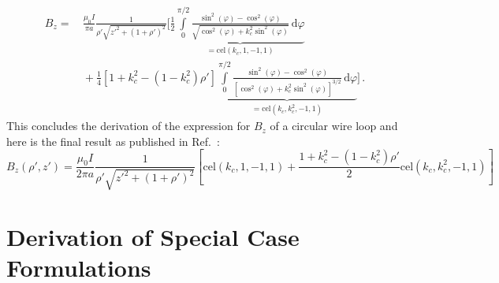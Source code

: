 \begin{align}
  B_z
 =&\, \frac{\mu_0 I}{\pi a}
      \frac{1}{\rho' \sqrt{z'^2 + (1 + \rho')^2}} \Biggl[
        \frac{1}{2} \underbrace{\int\limits_0^{\pi/2} \frac{\sin^2(\varphi) - \cos^2(\varphi)}
                                                           {\sqrt{\cos^2(\varphi) + k_c^2 \sin^2(\varphi)}} \,\mathrm{d}\varphi}_{=\textrm{cel}(k_c, 1, -1, 1)} \nonumber \\
 ~&\, + \frac{1}{4} \left[ 1 + k_c^2 - \left( 1 - k_c^2 \right) \rho' \right]
          \underbrace{\int\limits_0^{\pi/2} \frac{\sin^2(\varphi) - \cos^2(\varphi)}
                                                 {\left[\cos^2(\varphi) + k_c^2 \sin^2(\varphi) \right]^{3/2}} \,\mathrm{d}\varphi}_{=\textrm{cel}(k_c, k_c^2, -1, 1)} \Biggr] \, .
\end{align}
This concludes the derivation of the expression for $B_z$ of a circular wire loop
and here is the final result as published in Ref.~\cite{teal}:
\begin{equation}
\boxed{
 B_z(\rho', z')
 = \frac{\mu_0 I}{2 \pi a}
   \frac{1}{\rho' \sqrt{z'^2 + (1 + \rho')^2}}
   \left[
       \textrm{cel}(k_c, 1, -1, 1)
     + \frac{1 + k_c^2 - \left( 1 - k_c^2 \right) \rho'}{2} \textrm{cel}(k_c, k_c^2, -1, 1)
   \right]
}
\end{equation}

\section{Derivation of Special Case Formulations}
\label{apx:derivation_of_special_case_formulations}
